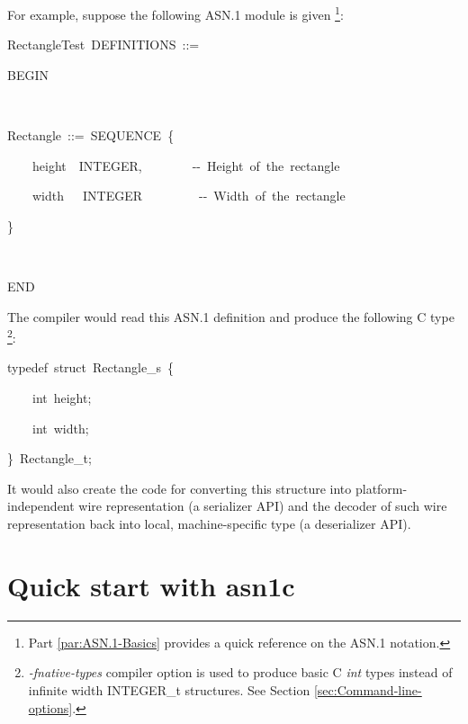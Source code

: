 \documentclass[english,oneside,12pt]{book}
\newenvironment{lyxcode}
{\par\begin{list}{}{
\setlength{\rightmargin}{\leftmargin}
\setlength{\listparindent}{0pt}%
\raggedright
\setlength{\itemsep}{0pt}
\setlength{\parsep}{0pt}
\normalfont\ttfamily}%
 \item[]}
{\end{list}}
\begin{document}
For example, suppose the following ASN.1 module is given%
\footnote{Part \vref{par:ASN.1-Basics} provides a quick reference
on the ASN.1 notation.}:
\begin{lyxcode}
RectangleTest~DEFINITIONS~::=

BEGIN

~

Rectangle~::=~SEQUENCE~\{

~~~~height~~INTEGER,~~~~~~~~-{}-~Height~of~the~rectangle

~~~~width~~~INTEGER~~~~~~~~~-{}-~Width~of~the~rectangle

\}

~

END
\end{lyxcode}
The compiler would read this ASN.1 definition and produce the following
C type%
\footnote{\emph{-fnative-types} compiler option is used to produce basic C \emph{int}
types instead of infinite width INTEGER\_t structures. See Section
\vref{sec:Command-line-options}.%
}:
\begin{lyxcode}
typedef~struct~Rectangle\_s~\{

~~~~int~height;

~~~~int~width;

\}~Rectangle\_t;
\end{lyxcode}
It would also create the code for converting this structure into platform-independent
wire representation (a serializer API) and the decoder of such wire
representation back into local, machine-specific type (a deserializer
API).


\section{Quick start with asn1c}
\end{document}
